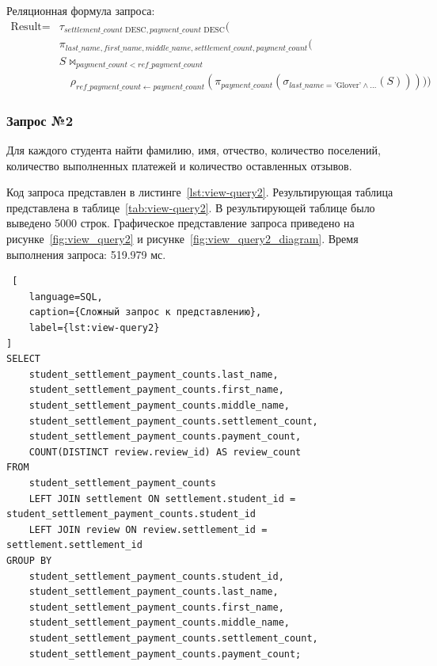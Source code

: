 Реляционная формула запроса:
\begin{align*}
\text{Result} = {} & \tau_{\mathit{settlement\_count}\text{ DESC}, \mathit{payment\_count}\text{ DESC}} \Biggl( \\
& \pi_{\mathit{last\_name}, \mathit{first\_name}, \mathit{middle\_name}, \mathit{settlement\_count}, \mathit{payment\_count}} \Biggl( \\
& S \mathbin{\bowtie}_{\mathit{payment\_count} < \mathit{ref\_payment\_count}} \\
& \quad \rho_{\mathit{ref\_payment\_count} \leftarrow \mathit{payment\_count}}\left(\pi_{\mathit{payment\_count}}\left(\sigma_{\mathit{last\_name}=\text{'Glover'} \wedge \dots}(S)\right)\right) \Biggr) \Biggr)
\end{align*}

\subsubsection{Запрос №2}

Для каждого студента найти фамилию, имя, отчество, количество поселений, количество выполненных платежей и количество оставленных отзывов.

Код запроса представлен в листинге~\ref{lst:view-query2}. Результирующая таблица представлена в таблице~\ref{tab:view-query2}. В результирующей таблице было выведено 5000 строк. Графическое представление запроса приведено на рисунке~\ref{fig:view_query2} и рисунке~\ref{fig:view_query2_diagram}. Время выполнения запроса: 519.979 мс.

\begin{lstlisting} [
    language=SQL,
    caption={Сложный запрос к представлению},
    label={lst:view-query2}
]
SELECT
    student_settlement_payment_counts.last_name,
    student_settlement_payment_counts.first_name,
    student_settlement_payment_counts.middle_name,
    student_settlement_payment_counts.settlement_count,
    student_settlement_payment_counts.payment_count,
    COUNT(DISTINCT review.review_id) AS review_count
FROM
    student_settlement_payment_counts
    LEFT JOIN settlement ON settlement.student_id = student_settlement_payment_counts.student_id
    LEFT JOIN review ON review.settlement_id = settlement.settlement_id
GROUP BY
    student_settlement_payment_counts.student_id,
    student_settlement_payment_counts.last_name,
    student_settlement_payment_counts.first_name,
    student_settlement_payment_counts.middle_name,
    student_settlement_payment_counts.settlement_count,
    student_settlement_payment_counts.payment_count;
\end{lstlisting}

